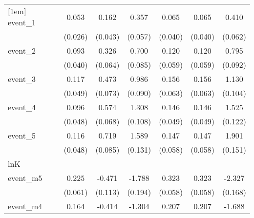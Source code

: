 {\begin{tabular}{l*{6}{c}}
[1em]
event\_1     &       0.053\sym{*}  &       0.162\sym{***}&       0.357\sym{***}&       0.065         &       0.065         &       0.410\sym{***}\\
            &     (0.026)         &     (0.043)         &     (0.057)         &     (0.040)         &     (0.040)         &     (0.062)         \\
[1em]
event\_2     &       0.093\sym{*}  &       0.326\sym{***}&       0.700\sym{***}&       0.120\sym{*}  &       0.120\sym{*}  &       0.795\sym{***}\\
            &     (0.040)         &     (0.064)         &     (0.085)         &     (0.059)         &     (0.059)         &     (0.092)         \\
[1em]
event\_3     &       0.117\sym{*}  &       0.473\sym{***}&       0.986\sym{***}&       0.156\sym{*}  &       0.156\sym{*}  &       1.130\sym{***}\\
            &     (0.049)         &     (0.073)         &     (0.090)         &     (0.063)         &     (0.063)         &     (0.104)         \\
[1em]
event\_4     &       0.096\sym{*}  &       0.574\sym{***}&       1.308\sym{***}&       0.146\sym{**} &       0.146\sym{**} &       1.525\sym{***}\\
            &     (0.048)         &     (0.068)         &     (0.108)         &     (0.049)         &     (0.049)         &     (0.122)         \\
[1em]
event\_5     &       0.116\sym{*}  &       0.719\sym{***}&       1.589\sym{***}&       0.147\sym{*}  &       0.147\sym{*}  &       1.901\sym{***}\\
            &     (0.048)         &     (0.085)         &     (0.131)         &     (0.058)         &     (0.058)         &     (0.151)         \\
\hline
lnK         &                     &                     &                     &                     &                     &                     \\
event\_m5    &       0.225\sym{***}&      -0.471\sym{***}&      -1.788\sym{***}&       0.323\sym{***}&       0.323\sym{***}&      -2.327\sym{***}\\
            &     (0.061)         &     (0.113)         &     (0.194)         &     (0.058)         &     (0.058)         &     (0.168)         \\
[1em]
event\_m4    &       0.164\sym{**} &      -0.414\sym{***}&      -1.304\sym{***}&       0.207\sym{**} &       0.207\sym{**} &      -1.688\sym{***}\\

\end{tabular}}
